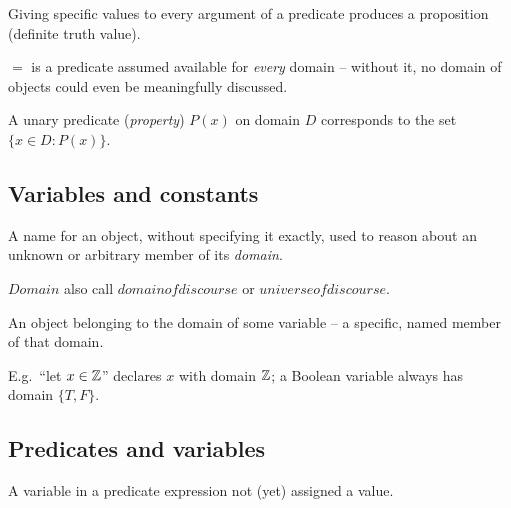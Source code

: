 \documentclass[11pt]{article}
\begin{document}
\begin{note}
Giving specific values to every argument of a predicate produces a proposition (definite truth value).
\end{note}

\begin{note}
$=$ is a predicate assumed available for \emph{every} domain -- without it, no domain of objects could even be meaningfully discussed.
\end{note}

\begin{definition}[Property]
A unary predicate (\emph{property}) $P(x)$ on domain $D$ corresponds to the set $\{x\in D : P(x)\}$.
\end{definition}

\subsection{Variables and constants}
\label{sec:5-2}

\begin{definition}[Variable]
A name for an object, without specifying it exactly, used to reason about an unknown or arbitrary member of its \emph{domain}.
\end{definition}

\begin{note}[Domain]
    $Domain$ also call $domain of discourse$ or $universe of discourse$.
\end{note}

\begin{definition}[Constant]
An object belonging to the domain of some variable -- a specific, named member of that domain.
\end{definition}

\begin{note}
E.g.\ ``let $x\in\mathbb{Z}$'' declares $x$ with domain $\mathbb{Z}$; a Boolean variable always has domain $\{T,F\}$.
\end{note}

\subsection{Predicates and variables}
\label{sec:5-3}

\begin{definition}
A variable in a predicate expression not (yet) assigned a value.
\end{definition}
\end{document}
